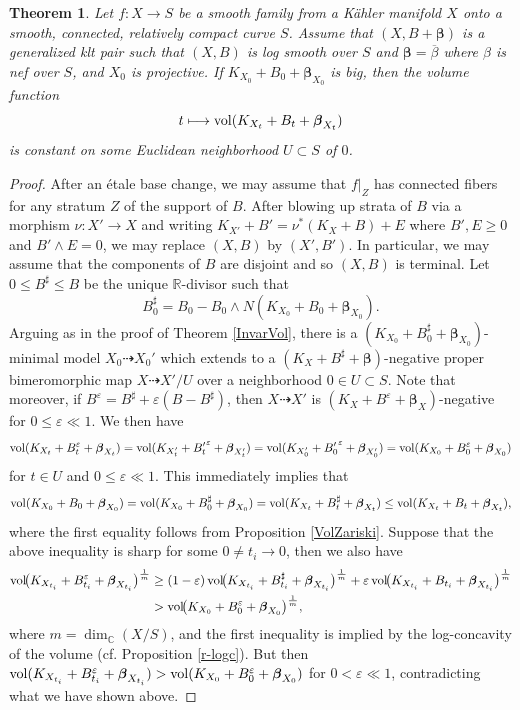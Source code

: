 \documentclass[12pt]{amsart}
\numberwithin{equation}{section}
\newtheorem{theorem} {Theorem} [section]
\theoremstyle{definition}
\theoremstyle{plain}
\newtheorem*{thm A*}{Theorem A}
\newtheorem*{thm B*}{Theorem B}
\newtheorem*{thm C*}{Theorem C}
\newtheorem*{thm D*}{Theorem D}
\theoremstyle{definition}
\renewcommand{\1}{\mathds{1}}
\newcommand{\bbeta}{\boldsymbol{\beta}}
\renewcommand{\>}{\rightarrow}
\newcommand{\R}{\mathbb R}
\begin{document}
\begin{theorem}\label{InvarVol2}
Let $f:X\to S$ be a smooth family from a K\"ahler manifold $X$ onto a smooth, connected, relatively compact curve $S$. Assume that $(X,B+\bbeta)$ is a generalized klt pair such that $(X,B)$ is log smooth over $S$ and $\bbeta =\overline \beta $ where $\beta$ is nef over $S$, and $X_0$ is projective. If $K_{X_0}+B_0+\bbeta _{X_0}$ is big, then the volume function
\[t\longmapsto {\rm vol}(K_{X_t}+B_t+\bbeta _{X_t})\]
is constant on some Euclidean neighborhood $U\subset S$ of $0$.
\end{theorem}
\begin{proof}
After an \'etale base change, we may assume that $f|_Z$ has connected fibers for any stratum $Z$ of the support of $B$. After blowing up strata of $B$ via a morphism $\nu :X'\to X$ and writing $K_{X'}+B'=\nu^*(K_X+B)+E$ where $B',E\ge 0$ and $B'\wedge E=0$, we may replace $(X,B)$ by $(X',B')$. In particular, we may assume that the components of $B$ are disjoint and so $(X,B)$ is terminal. Let $0\leq B^\sharp\leq B$ be the unique $\R$-divisor such that  $$B^\sharp _0=B_0-B_0\wedge N(K_{X_0}+B_0+\bbeta_{X_0}).$$ Arguing as in the proof of Theorem \ref{InvarVol}, there is a $(K_{X_0}+B^\sharp_0+\bbeta _{X_0})$-minimal model $X_0\dasharrow X_0'$ which extends to a $(K_X+B^\sharp+\bbeta)$-negative proper bimeromorphic map $X\dasharrow X'/U$ over a neighborhood $0\in U\subset S$. Note that moreover, if $B^\varepsilon =B^\sharp+\varepsilon(B-B^\sharp)$, then $X\dasharrow X'$ is $(K_X+B^\varepsilon+\bbeta_X)$-negative for $0\leq \varepsilon \ll 1$. We then have \[{\rm vol}(K_{X_t}+B_t^\varepsilon+\bbeta_{X_t})={\rm vol}(K_{X'_t}+{B'_t}^\varepsilon+\bbeta_{X'_t})={\rm vol}(K_{X'_0}+{B'_0}^\varepsilon+\bbeta_{X'_0})={\rm vol}(K_{X_0}+B_0^\varepsilon+\bbeta_{X_0})\]
for $t\in U$ and $0\leq \varepsilon \ll 1$.
This immediately implies that 
\[{\rm vol}(K_{X_0}+B_0+\bbeta_{X_0})={\rm vol}(K_{X_0}+B^\sharp _0+\bbeta_{X_0})={\rm vol}(K_{X_t}+B^\sharp _t+\bbeta_{X_t})\leq {\rm vol}(K_{X_t}+B _t+\bbeta_{X_t}),\]where the first equality follows from Proposition \ref{VolZariski}.
Suppose that the above inequality is sharp for some $0\ne t_i\to 0$, then we also have 
\[
\begin{aligned}
{\rm vol}\!\bigl(K_{X_{t_i}} + B^\varepsilon_{t_i} + \bbeta_{X_{t_i}}\bigr)^{\frac{1}{m}}
&\ge (1 - \varepsilon)\, {\rm vol}\!\bigl(K_{X_{t_i}} + B^\sharp_{t_i} + \bbeta_{X_{t_i}}\bigr)^{\frac{1}{m}}
+ \varepsilon\, {\rm vol}\!\bigl(K_{X_{t_i}} + B_{t_i} + \bbeta_{X_{t_i}}\bigr)^{\frac{1}{m}} \\
&> {\rm vol}\!\bigl(K_{X_0} + B^\varepsilon_0 + \bbeta_{X_0}\bigr)^{\frac{1}{m}},
\end{aligned}
\]
where $m = \dim_{\mathbb{C}}(X/S)$, and the first inequality is implied by the log-concavity of the volume (cf. Proposition \ref{r-logc}). But then ${\rm vol}(K_{X_{t_i}}+B^\varepsilon _{t_i}+\bbeta_{X_{t_i}})>{\rm vol}(K_{X_0}+B^\varepsilon _0+\bbeta_{X_0})$ for $0<\varepsilon \ll 1$, contradicting what we have shown above.
\end{proof}
\end{document}
